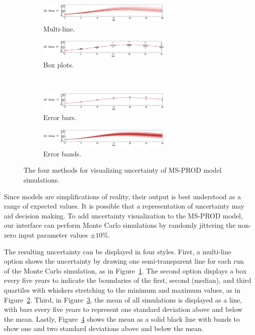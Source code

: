 \begin{figure}
\centering
	\begin{subfigure}[b]{0.45\textwidth}
		\centering
		\includegraphics[width=6.5cm]{figures/eps/msprod_uncertainty_multline.eps}
		\caption{Multi-line.}
		\label{fig:uncertaintyStreak}
	\end{subfigure}	
	\begin{subfigure}[b]{0.45\textwidth}
		\centering
		\includegraphics[width=6.5cm]{figures/eps/msprod_uncertainty_boxplots.eps}
		\caption{Box plots.}
		\label{fig:uncertaintyBoxplots}
	\end{subfigure} \\
	\begin{subfigure}[b]{0.45\textwidth}
		\centering
		\includegraphics[width=6.5cm]{figures/eps/msprod_uncertainty_errorbar.eps}
		\caption{Error bars.}
		\label{fig:uncertaintyErrorbars}
	\end{subfigure}
	\begin{subfigure}[b]{0.45\textwidth}
		\centering
		\includegraphics[width=6.5cm]{figures/eps/msprod_uncertainty_errorbands.eps}
		\caption{Error bands.}
		\label{fig:uncertaintyErrorbands}
	\end{subfigure}
	\caption{The four methods for visualizing uncertainty of MS-PROD model simulations.}
	\label{fig:uncertainty}
\end{figure}

Since models are simplifications of reality, their output is best understood as a range of expected values.  It is possible that a representation of uncertainty may aid decision making.  To add uncertainty visualization to the MS-PROD model, our interface can perform Monte Carlo simulations by randomly jittering the non-zero input parameter values $\pm 10\%$.

The resulting uncertainty can be displayed in four styles.  First, a multi-line option shows the uncertainty by drawing one semi-transparent line for each run of the Monte Carlo simulation, as in Figure~\ref{fig:uncertaintyStreak}. The second option displays a box every five years to indicate the boundaries of the first, second (median), and third quartiles with whiskers stretching to the minimum and maximum values, as in Figure~\ref{fig:uncertaintyBoxplots}.  Third, in Figure~\ref{fig:uncertaintyErrorbars}, the mean of all simulations is displayed as a line, with bars every five years to represent one standard deviation above and below the mean.  Lastly, Figure~\ref{fig:uncertaintyErrorbands} shows the mean as a solid black line with bands to show one and two standard deviations above and below the mean.
